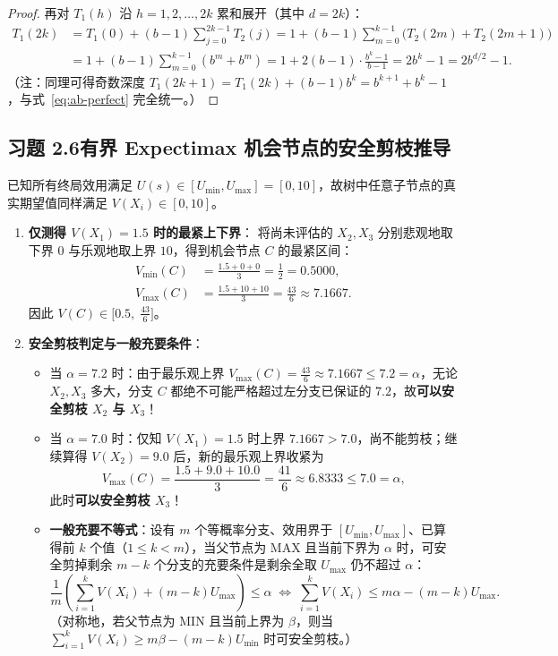 \begin{proof}
再对 $T_1(h)$ 沿 $h = 1, 2, \dots, 2k$ 累和展开（其中 $d = 2k$）：
\begin{align*}
  T_1(2k) &= T_1(0) + (b - 1)\sum_{j=0}^{2k-1} T_2(j)
          = 1 + (b - 1)\sum_{m=0}^{k-1} \big(T_2(2m) + T_2(2m+1)\big) \\
          &= 1 + (b - 1)\sum_{m=0}^{k-1} (b^m + b^m)
          = 1 + 2(b - 1)\cdot \frac{b^k - 1}{b - 1}
          = 2 b^k - 1 = 2 b^{d/2} - 1.
\end{align*}
（注：同理可得奇数深度 $T_1(2k+1) = T_1(2k) + (b-1)b^k = b^{k+1} + b^k - 1$，与式~\eqref{eq:ab-perfect} 完全统一。）
\end{proof}

\subsection*{习题 2.6\quad 有界 Expectimax 机会节点的安全剪枝推导}
已知所有终局效用满足 $U(s) \in [U_{\min}, U_{\max}] = [0, 10]$，故树中任意子节点的真实期望值同样满足 $V(X_i) \in [0, 10]$。
\begin{enumerate}[label=(\arabic*), leftmargin=1.8em]
  \item \textbf{仅测得 $V(X_1) = 1.5$ 时的最紧上下界}：
  将尚未评估的 $X_2, X_3$ 分别悲观地取下界 $0$ 与乐观地取上界 $10$，得到机会节点 $C$ 的最紧区间：
  \begin{align*}
    V_{\min}(C) &= \frac{1.5 + 0 + 0}{3} = \frac{1}{2} = \mathbf{0.5000}, \\
    V_{\max}(C) &= \frac{1.5 + 10 + 10}{3} = \frac{43}{6} \approx \mathbf{7.1667}.
  \end{align*}
  因此 $V(C) \in \big[0.5,\; \frac{43}{6}\big]$。
  \item \textbf{安全剪枝判定与一般充要条件}：
  \begin{itemize}
    \item 当 $\alpha = 7.2$ 时：由于最乐观上界 $V_{\max}(C) = \frac{43}{6} \approx 7.1667 \le 7.2 = \alpha$，无论 $X_2, X_3$ 多大，分支 $C$ 都绝不可能严格超过左分支已保证的 $7.2$，故\textbf{可以安全剪枝 $X_2$ 与 $X_3$}！
    \item 当 $\alpha = 7.0$ 时：仅知 $V(X_1)=1.5$ 时上界 $7.1667 > 7.0$，尚不能剪枝；继续算得 $V(X_2) = 9.0$ 后，新的最乐观上界收紧为
    \[
      V_{\max}(C) = \frac{1.5 + 9.0 + 10.0}{3} = \frac{41}{6} \approx 6.8333 \le 7.0 = \alpha,
    \]
    此时\textbf{可以安全剪枝 $X_3$}！
    \item \textbf{一般充要不等式}：设有 $m$ 个等概率分支、效用界于 $[U_{\min}, U_{\max}]$、已算得前 $k$ 个值（$1 \le k < m$），当父节点为 \textsf{MAX} 且当前下界为 $\alpha$ 时，可安全剪掉剩余 $m-k$ 个分支的充要条件是剩余全取 $U_{\max}$ 仍不超过 $\alpha$：
    \[
      \frac{1}{m}\left(\sum_{i=1}^{k} V(X_i) + (m - k) U_{\max}\right) \le \alpha
      \;\Longleftrightarrow\;
      \sum_{i=1}^{k} V(X_i) \le m\alpha - (m - k) U_{\max}.
    \]
    （对称地，若父节点为 \textsf{MIN} 且当前上界为 $\beta$，则当 $\sum_{i=1}^{k} V(X_i) \ge m\beta - (m-k)U_{\min}$ 时可安全剪枝。）
  \end{itemize}
\end{enumerate}

